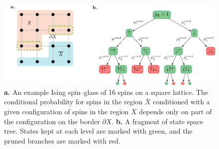 \begin{figure}
  \centering
  \includegraphics[width=\textwidth]{figures/squarelattice.pdf}
  \caption{\textbf{a.} An example Ising spin--glass  of 16 spins on a square lattice. The conditional probability for spins in the region $\overline{X}$ conditioned with a given configuration of spins in the region $X$ depends only on part of the configuration on the border $\partial X$. \textbf{b.} A fragment of state space tree. States kept at each level
    are marked with green, and the pruned branches are marked with red.}
  \label{fig:lattice-and-border}
\end{figure}

